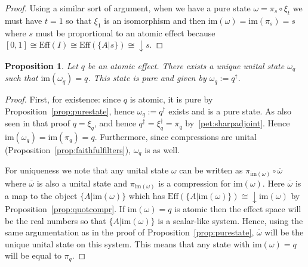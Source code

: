 \documentclass[b5paper,onecolumn,12pt,accepted=2019-05-03, issue=1, volume=1, shorttitle=papers/compositionality-1-1]{compositionalityarticle}
\newcounter{counter}
\numberwithin{counter}{section}
\newtheorem{proposition}[counter]{Proposition}
\newtheorem{corollary}[counter]{Corollary}
\newcommand{\asrt}{\text{asrt}}
\newcommand{\pred}{\text{Eff}}
\newcommand{\cl}[1]{\overline{#1}}
\newcommand{\im}[1]{\text{im}(#1)}
\begin{document}
\begin{proof}
	Using a similar sort of argument, when we have a pure state $\omega=\pi_s\circ \xi_t$ we must have $t=1$ so that $\xi_1$ is an isomorphism and then $\im{\omega}=\im{\pi_s}=s$ where $s$ must be proportional to an atomic effect because $[0,1]\cong \pred(I)\cong \pred(\{A\lvert s\}) \cong \downarrow s$.
\end{proof}

\begin{proposition} \label{prop:atomicstate}
	Let $q$ be an atomic effect. There exists a unique unital state $\omega_q$ such that $\im{\omega_q}=q$. This state is pure and given by $\omega_q:=q^\dagger$.
\end{proposition}
\begin{proof}
    First, for existence: since $q$ is atomic, it is pure by Proposition~\ref{prop:purestate}, hence $\omega_q:=q^\dagger$ exists and is a pure state. As also seen in that proof $q=\xi_q$, and hence $q^\dagger = \xi_q^\dagger = \pi_q$ by~\ref{pet:sharpadjoint}. Hence $\im{\omega_q}=\im{\pi_q} = q$. Furthermore, since compressions are unital (Proposition~\ref{prop:faithfulfilters}), $\omega_q$ is as well.

	For uniqueness we note that any unital state $\omega$ can be written as $\pi_{\im{\omega}}\circ \cl{\omega}$ where $\cl{\omega}$ is also a unital state and $\pi_{\im{\omega}}$ is a compression for $\im{\omega}$. Here $\cl{\omega}$ is a map to the object $\{A\lvert \im{\omega}\}$ which has $\pred(\{A\lvert \im{\omega}\}) \cong \downarrow \im{\omega}$ by Proposition~\ref{prop:quotcompr}. If $\im{\omega}=q$ is atomic then the effect space will be the real numbers so that $\{A\lvert \im{\omega}\}$ is a scalar-like system. Hence, using the same argumentation as in the proof of Proposition~\ref{prop:purestate}, $\cl{\omega}$ will be the unique unital state on this system. This means that any state with $\im{\omega}=q$ will be equal to $\pi_q$.
\end{proof}
\end{document}
